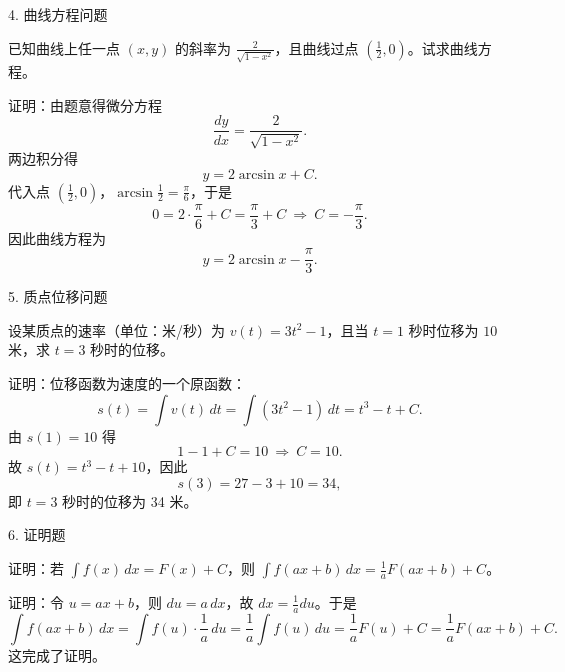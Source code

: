 4. 曲线方程问题

已知曲线上任一点 \((x,y)\) 的斜率为 \(\frac{2}{\sqrt{1-x^{2}}}\)，且曲线过点 \(\left(\frac{1}{2},0\right)\)。试求曲线方程。

证明：由题意得微分方程
\[ \frac{dy}{dx}=\frac{2}{\sqrt{1-x^{2}}}. \]
两边积分得
\[ y=2\arcsin x+C. \]
代入点 \(\left(\frac{1}{2},0\right)\)，\(\arcsin\frac{1}{2}=\frac{\pi}{6}\)，于是
\[ 0=2\cdot\frac{\pi}{6}+C=\frac{\pi}{3}+C\ \Rightarrow\ C=-\frac{\pi}{3}. \]
因此曲线方程为
\[ y=2\arcsin x-\frac{\pi}{3}. \]

5. 质点位移问题

设某质点的速率（单位：米/秒）为 \(v(t)=3t^{2}-1\)，且当 \(t=1\) 秒时位移为 \(10\) 米，求 \(t=3\) 秒时的位移。

证明：位移函数为速度的一个原函数：
\[ s(t)=\int v(t)\,dt=\int(3t^{2}-1)\,dt=t^{3}-t+C. \]
由 \(s(1)=10\) 得
\[ 1-1+C=10\ \Rightarrow\ C=10. \]
故 \(s(t)=t^{3}-t+10\)，因此
\[ s(3)=27-3+10=34, \]
即 \(t=3\) 秒时的位移为 34 米。

6. 证明题

证明：若 \(\int f(x)\,dx=F(x)+C\)，则 \(\int f(ax+b)\,dx=\frac{1}{a}F(ax+b)+C\)。

证明：令 \(u=ax+b\)，则 \(du=a\,dx\)，故 \(dx=\frac{1}{a}du\)。于是
\[ \int f(ax+b)\,dx=\int f(u)\cdot\frac{1}{a}\,du=\frac{1}{a}\int f(u)\,du=\frac{1}{a}F(u)+C=\frac{1}{a}F(ax+b)+C. \]
这完成了证明。
